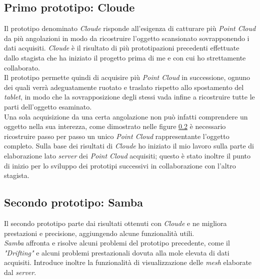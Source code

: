 \subsection{Primo prototipo: Cloude}
Il prototipo denominato \emph{Cloude} risponde all'esigenza di catturare più \emph{Point Cloud} da più angolazioni in modo da ricostruire l'oggetto scansionato sovrapponendo i dati acquisiti. \emph{Cloude} è il risultato di più prototipazioni precedenti effettuate dallo stagista che ha iniziato il progetto prima di me e con cui ho strettamente collaborato.\\
Il prototipo permette quindi di acquisire più \emph{Point Cloud} in successione, ognuno dei quali verrà adeguatamente ruotato e traslato rispetto allo spostamento del \emph{tablet}, in modo che la sovrapposizione degli stessi vada infine a ricostruire tutte le parti dell'oggetto esaminato.\\
Una sola acquisizione da una certa angolazione non può infatti comprendere un oggetto nella sua interezza, come dimostrato nelle figure \ref{}
 è necessario ricostruire passo per passo un unico \emph{Point Cloud} rappresentante l'oggetto completo.
Sulla base dei risultati di \emph{Cloude} ho iniziato il mio lavoro sulla parte di elaborazione lato \emph{server} dei \emph{Point Cloud} acquisiti; questo è stato inoltre il punto di inizio per lo sviluppo dei prototipi successivi in collaborazione con l'altro stagista.

\subsection{Secondo prototipo: Samba}
Il secondo prototipo parte dai risultati ottenuti con \emph{Cloude} e ne migliora prestazioni e precisione, aggiungendo alcune funzionalità utili. \\
\emph{Samba} affronta e risolve alcuni problemi del prototipo precedente, come il \emph{"Drifting"} e alcuni problemi prestazionali dovuta alla mole elevata di dati acquisiti. Introduce inoltre la funzionalità di visualizzazione delle \emph{mesh} elaborate dal \emph{server}.

